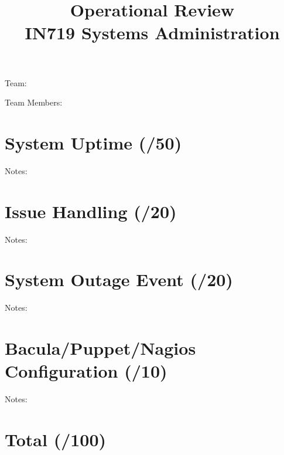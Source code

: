 \documentclass{article}   	%
\title{Operational Review\\ IN719 Systems Administration}
\date{}							%
\begin{document}
\maketitle

Team:

\vspace{5 mm}
Team Members:

\vspace{5 mm}

\section{System Uptime  (\underline{\hspace{1cm}}/50)}
Notes:

\vspace{5 cm}


\section{Issue Handling  (\underline{\hspace{1cm}}/20)}
Notes:

\newpage

\section{System Outage Event (\underline{\hspace{1 cm}}/20)}
Notes:

\vspace{7 cm}

\section{Bacula/Puppet/Nagios Configuration (\underline{\hspace{1 cm}}/10)}
Notes:

\vspace{7 cm}

\section*{Total (\underline{\hspace{1 cm}}/100)}
\end{document}
